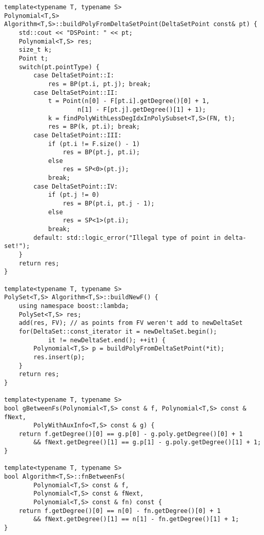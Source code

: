 \begin{lstlisting}
template<typename T, typename S>
Polynomial<T,S> Algorithm<T,S>::buildPolyFromDeltaSetPoint(DeltaSetPoint const& pt) {
    std::cout << "DSPoint: " << pt;
    Polynomial<T,S> res;
    size_t k;
    Point t;
    switch(pt.pointType) {
        case DeltaSetPoint::I:
            res = BP(pt.i, pt.j); break;
        case DeltaSetPoint::II:
            t = Point(n[0] - F[pt.i].getDegree()[0] + 1,
                    n[1] - F[pt.j].getDegree()[1] + 1);
            k = findPolyWithLessDegIdxInPolySubset<T,S>(FN, t);
            res = BP(k, pt.i); break;
        case DeltaSetPoint::III:
            if (pt.i != F.size() - 1)
                res = BP(pt.j, pt.i);
            else
                res = SP<0>(pt.j);
            break;
        case DeltaSetPoint::IV:
            if (pt.j != 0)
                res = BP(pt.i, pt.j - 1);
            else
                res = SP<1>(pt.i);
            break;
        default: std::logic_error("Illegal type of point in delta-set!");
    }
    return res;
}

template<typename T, typename S>
PolySet<T,S> Algorithm<T,S>::buildNewF() {
    using namespace boost::lambda;
    PolySet<T,S> res;
    add(res, FV); // as points from FV weren't add to newDeltaSet
    for(DeltaSet::const_iterator it = newDeltaSet.begin();
            it != newDeltaSet.end(); ++it) {
        Polynomial<T,S> p = buildPolyFromDeltaSetPoint(*it);
        res.insert(p);
    }
    return res;
}

template<typename T, typename S>
bool gBetweenFs(Polynomial<T,S> const & f, Polynomial<T,S> const & fNext,
        PolyWithAuxInfo<T,S> const & g) {
    return f.getDegree()[0] == g.p[0] - g.poly.getDegree()[0] + 1
        && fNext.getDegree()[1] == g.p[1] - g.poly.getDegree()[1] + 1;
}

template<typename T, typename S>
bool Algorithm<T,S>::fnBetweenFs(
        Polynomial<T,S> const & f,
        Polynomial<T,S> const & fNext,
        Polynomial<T,S> const & fn) const {
    return f.getDegree()[0] == n[0] - fn.getDegree()[0] + 1
        && fNext.getDegree()[1] == n[1] - fn.getDegree()[1] + 1;
}


\end{lstlisting}
